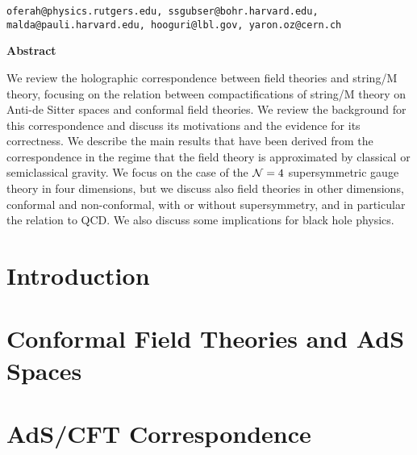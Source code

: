 \documentclass[12pt]{report}
\def\cn{{\cal N}}
\begin{document}
\begin{titlepage}
\begin{center}
{\tt oferah@physics.rutgers.edu, ssgubser@bohr.harvard.edu, 
 malda@pauli.harvard.edu, hooguri@lbl.gov, yaron.oz@cern.ch}



\vspace{5mm}

{\bf Abstract}
\end{center}

\noindent
We review the holographic correspondence between field theories
and string/M theory, focusing on the relation between
compactifications of string/M theory on Anti-de Sitter spaces and
conformal field theories.  We review the background for this 
correspondence
and discuss its motivations and the evidence for its correctness. We
describe the main results that have been derived from the
correspondence in the regime that the field theory is approximated 
by classical or semiclassical gravity.
 We focus on the case of the $\cn=4$ supersymmetric
gauge theory in four
dimensions, but we discuss also field theories in other dimensions,
conformal and non-conformal, with or without supersymmetry, and in
particular the relation to QCD. We also discuss some implications 
for black hole physics.

\end{titlepage}

\newpage
\tableofcontents
\newpage


\chapter{Introduction}
\label{ChapIntro}









\chapter{Conformal Field Theories and AdS Spaces}
\label{ChapCFT}





\chapter{AdS/CFT Correspondence}
\label{ChapCorrBasic}
\end{document}
